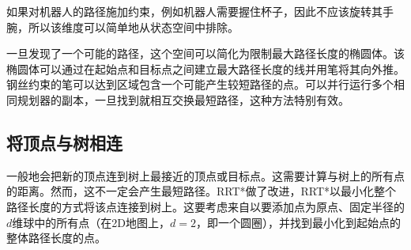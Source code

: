 如果对机器人的路径施加约束，例如机器人需要握住杯子，因此不应该旋转其手腕，所以该维度可以简单地从状态空间中排除。


一旦发现了一个可能的路径，这个空间可以简化为限制最大路径长度的椭圆体。该椭圆体可以通过在起始点和目标点之间建立最大路径长度的线并用笔将其向外推。钢丝约束的笔可以达到区域包含一个可能产生较短路径的点。可以并行运行多个相同规划器的副本，一旦找到就相互交换最短路径，这种方法特别有效\cite{otte2012}。


\subsection{将顶点与树相连}
一般地会把新的顶点连到树上最接近的顶点或目标点。这需要计算与树上的所有点的距离。然而，这不一定会产生最短路径。RRT*做了改进，RRT*以最小化整个路径长度的方式将该点连接到树上。这要考虑来自以要添加点为原点、固定半径的$d$维球中的所有点（在2D地图上，$d=2$，即一个圆圈），并找到最小化到起始点的整体路径长度的点。


